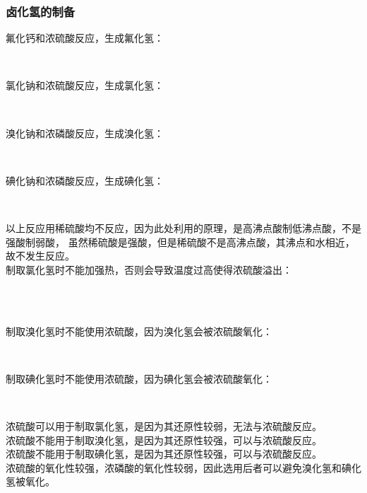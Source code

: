 \documentclass[UTF8]{ctexart}
\begin{document}
\subsubsection{卤化氢的制备}
    氟化钙和浓硫酸反应，生成氟化氢：
    \begin{center}
        \\[6mm]
    \end{center}
    氯化钠和浓硫酸反应，生成氯化氢：
    \begin{center}
        \\[6mm]
    \end{center}
    溴化钠和浓磷酸反应，生成溴化氢：
    \begin{center}
        \\[6mm]
    \end{center}
    碘化钠和浓磷酸反应，生成碘化氢：
    \begin{center}
        \\[6mm]
    \end{center}
    以上反应用稀硫酸均不反应，因为此处利用的原理，是高沸点酸制低沸点酸，不是强酸制弱酸，
    虽然稀硫酸是强酸，但是稀硫酸不是高沸点酸，其沸点和水相近，故不发生反应。\\[8mm]
    制取氯化氢时不能加强热，否则会导致温度过高使得浓硫酸溢出：\vspace{5pt}
    \begin{center}
        \\[3mm]
        \\[6mm]
    \end{center}
    制取溴化氢时不能使用浓硫酸，因为溴化氢会被浓硫酸氧化：
    \begin{center}
        \\[6mm]
    \end{center}
    制取碘化氢时不能使用浓硫酸，因为碘化氢会被浓硫酸氧化：
    \begin{center}
        \\[6mm]
    \end{center}
    浓硫酸可以用于制取氯化氢，是因为其还原性较弱，无法与浓硫酸反应。\\[3mm]
    浓硫酸不能用于制取溴化氢，是因为其还原性较强，可以与浓硫酸反应。\\[3mm]
    浓硫酸不能用于制取碘化氢，是因为其还原性较强，可以与浓硫酸反应。\\[3mm]
    浓硫酸的氧化性较强，浓磷酸的氧化性较弱，因此选用后者可以避免溴化氢和碘化氢被氧化。
\end{document}
